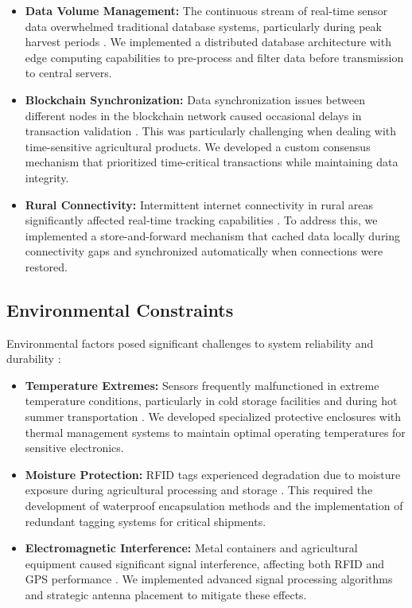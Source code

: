 \documentclass[conference]{IEEEtran}
\begin{document}
\begin{itemize}
    \item \textbf{Data Volume Management:} The continuous stream of real-time sensor data overwhelmed traditional database systems, particularly during peak harvest periods \cite{hernandez2024implementation}. We implemented a distributed database architecture with edge computing capabilities to pre-process and filter data before transmission to central servers.
    
    \item \textbf{Blockchain Synchronization:} Data synchronization issues between different nodes in the blockchain network caused occasional delays in transaction validation \cite{al2021prochain}. This was particularly challenging when dealing with time-sensitive agricultural products. We developed a custom consensus mechanism that prioritized time-critical transactions while maintaining data integrity.
    
    \item \textbf{Rural Connectivity:} Intermittent internet connectivity in rural areas significantly affected real-time tracking capabilities \cite{visconti2020development}. To address this, we implemented a store-and-forward mechanism that cached data locally during connectivity gaps and synchronized automatically when connections were restored.
\end{itemize}

\subsection{Environmental Constraints}
Environmental factors posed significant challenges to system reliability and durability \cite{rayhana2021rfid}:

\begin{itemize}
    \item \textbf{Temperature Extremes:} Sensors frequently malfunctioned in extreme temperature conditions, particularly in cold storage facilities and during hot summer transportation \cite{elbeheiry2023technologies}. We developed specialized protective enclosures with thermal management systems to maintain optimal operating temperatures for sensitive electronics.
    
    \item \textbf{Moisture Protection:} RFID tags experienced degradation due to moisture exposure during agricultural processing and storage \cite{xu2023novel}. This required the development of waterproof encapsulation methods and the implementation of redundant tagging systems for critical shipments.
    
    \item \textbf{Electromagnetic Interference:} Metal containers and agricultural equipment caused significant signal interference, affecting both RFID and GPS performance \cite{rosero2023smart}. We implemented advanced signal processing algorithms and strategic antenna placement to mitigate these effects.
\end{itemize}
\end{document}
